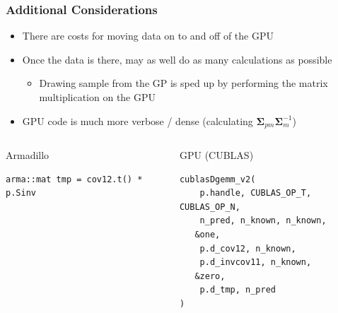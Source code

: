 \documentclass{beamer}
\begin{document}

\begin{frame}[fragile]
\frametitle{Additional Considerations}

\begin{itemize}
\item There are costs for moving data on to and off of the GPU
\item Once the data is there, may as well do as many calculations as possible
\begin{itemize}
\item Drawing sample from the GP is sped up by performing the matrix multiplication on the GPU
\end{itemize}
\item GPU code is much more verbose / dense (calculating $\bm\Sigma_{pm}\bm\Sigma_{m}^{-1}$)
\end{itemize}

\pause

{\scriptsize
\begin{columns}
\begin{block}{Armadillo}
\begin{verbatim}
arma::mat tmp = cov12.t() * p.Sinv
\end{verbatim}
\end{block}
\begin{block}{GPU (CUBLAS)}
\begin{verbatim}
cublasDgemm_v2( 
    p.handle, CUBLAS_OP_T, CUBLAS_OP_N,
    n_pred, n_known, n_known,
   &one,
    p.d_cov12, n_known,
    p.d_invcov11, n_known,
   &zero,
    p.d_tmp, n_pred
)
\end{verbatim}
\end{block}
\end{columns}
}

\end{frame}

\end{document}
